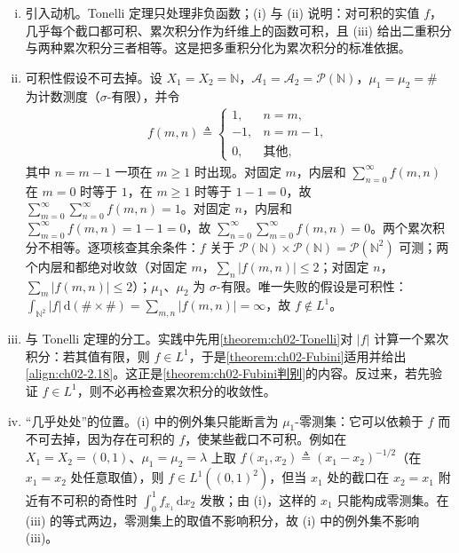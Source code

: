 \documentclass[../../main.tex]{subfiles}%
\begin{document}
\begin{remark}\label{remark:ch02-Fubini动机}
\begin{enumerate}[(i)]
\item 引入动机。Tonelli 定理只处理非负函数；(i) 与 (ii) 说明：对可积的实值 $f$，几乎每个截口都可积、累次积分作为纤维上的函数可积，且 (iii) 给出二重积分与两种累次积分三者相等。这是把多重积分化为累次积分的标准依据。
\item 可积性假设不可去掉。设 $X_1=X_2=\mathbb N$，$\mathscr A_1=\mathscr A_2=\mathscr P(\mathbb N)$，$\mu_1=\mu_2=\#$ 为计数测度（$\sigma$-有限），并令
\begin{align*}
f(m,n)\triangleq
\begin{cases}
1, & n=m,\\
-1, & n=m-1,\\
0, & \text{其他},
\end{cases}
\end{align*}
其中 $n=m-1$ 一项在 $m\geqslant1$ 时出现。对固定 $m$，内层和 $\sum_{n=0}^\infty f(m,n)$ 在 $m=0$ 时等于 $1$，在 $m\geqslant1$ 时等于 $1-1=0$，故 $\sum_{m=0}^\infty\sum_{n=0}^\infty f(m,n)=1$。对固定 $n$，内层和 $\sum_{m=0}^\infty f(m,n)=1-1=0$，故 $\sum_{n=0}^\infty\sum_{m=0}^\infty f(m,n)=0$。两个累次积分不相等。逐项核查其余条件：$f$ 关于 $\mathscr P(\mathbb N)\times\mathscr P(\mathbb N)=\mathscr P(\mathbb N^2)$ 可测；两个内层和都绝对收敛（对固定 $m$，$\sum_n|f(m,n)|\leqslant2$；对固定 $n$，$\sum_m|f(m,n)|\leqslant2$）；$\mu_1$、$\mu_2$ 为 $\sigma$-有限。唯一失败的假设是可积性：$\int_{\mathbb N^2}|f|\,\mathrm{d}(\#\times\#)=\sum_{m,n}|f(m,n)|=\infty$，故 $f\notin L^1$。
\item 与 Tonelli 定理的分工。实践中先用\cref{theorem:ch02-Tonelli}对 $|f|$ 计算一个累次积分：若其值有限，则 $f\in L^1$，于是\cref{theorem:ch02-Fubini}适用并给出\eqref{align:ch02-2.18}。这正是\cref{theorem:ch02-Fubini判别}的内容。反过来，若先验证 $f\in L^1$，则不必再检查累次积分的收敛性。
\item “几乎处处”的位置。(i) 中的例外集只能断言为 $\mu_1$-零测集：它可以依赖于 $f$ 而不可去掉，因为存在可积的 $f$，使某些截口不可积。例如在 $X_1=X_2=(0,1)$、$\mu_1=\mu_2=\lambda$ 上取 $f(x_1,x_2)\triangleq(x_1-x_2)^{-1/2}$（在 $x_1=x_2$ 处任意取值），则 $f\in L^1((0,1)^2)$，但当 $x_1$ 处的截口在 $x_2=x_1$ 附近有不可积的奇性时 $\int_0^1f_{x_1}\,\mathrm{d}x_2$ 发散；由 (i)，这样的 $x_1$ 只能构成零测集。在 (iii) 的等式两边，零测集上的取值不影响积分，故 (i) 中的例外集不影响 (iii)。
\end{enumerate}
\end{remark}
\end{document}

